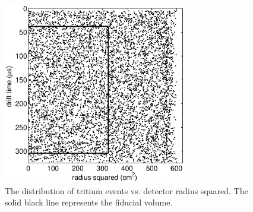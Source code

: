 \begin{figure}[h!]\centering
\includegraphics[width=80mm]{CH3T_RZ_scatter_lux10_20130812T1546.eps}
\caption{The distribution of tritium events vs. detector radius squared. The solid black line represents the fiducial volume.
}
\label{fig:Density}
\end{figure}





